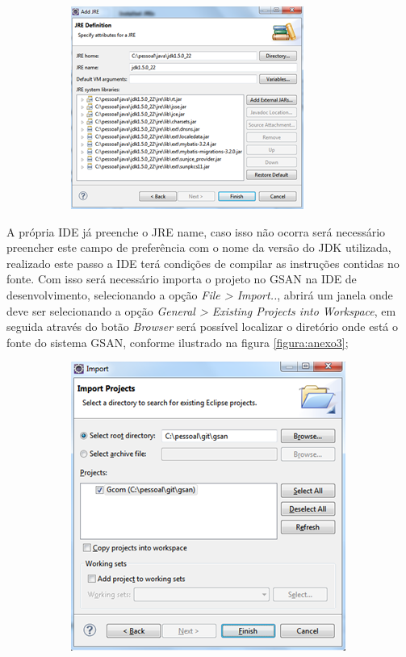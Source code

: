 \begin{apendicesenv}
\begin{figure}[H]
	\centering
	\caption*{Adicionar nova JRE na IDE.}
	\label{figura:anexo2}
	\begin{subfigure}[H]{\textwidth}
		\centering
		\includegraphics{figuras/anexo/addJRE.png}
	\end{subfigure}
\end{figure}

A própria IDE já preenche o JRE name, caso isso não ocorra será necessário preencher este campo de preferência com o nome da versão do JDK utilizada, realizado este passo a IDE terá condições de compilar as instruções contidas no fonte.  Com isso será necessário importa o projeto no GSAN na IDE de desenvolvimento, selecionando a opção \textit{File > Import..}, abrirá um janela onde deve ser selecionando a opção \textit{General > Existing Projects into Workspace}, em seguida através do botão \textit{Browser} será possível localizar o diretório onde está o fonte do sistema GSAN, conforme ilustrado na figura \ref{figura:anexo3};

\begin{figure}[H]
	\centering
	\caption*{Importar Sistema GSAN na IDE.}
	\label{figura:anexo3}
	\begin{subfigure}[H]{\textwidth}
		\centering
		\includegraphics{figuras/anexo/importGSAN.png}
	\end{subfigure}
\end{figure}



\end{apendicesenv}
